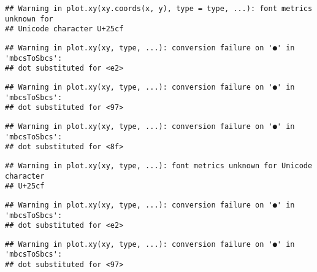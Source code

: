 \documentclass[
]{article}
\newenvironment{Shaded}{\begin{snugshade}}{\end{snugshade}}
\newcommand{\AttributeTok}[1]{\textcolor[rgb]{0.77,0.63,0.00}{#1}}
\newcommand{\DecValTok}[1]{\textcolor[rgb]{0.00,0.00,0.81}{#1}}
\newcommand{\FloatTok}[1]{\textcolor[rgb]{0.00,0.00,0.81}{#1}}
\newcommand{\FunctionTok}[1]{\textcolor[rgb]{0.00,0.00,0.00}{#1}}
\newcommand{\NormalTok}[1]{#1}
\newcommand{\SpecialCharTok}[1]{\textcolor[rgb]{0.00,0.00,0.00}{#1}}
\newcommand{\StringTok}[1]{\textcolor[rgb]{0.31,0.60,0.02}{#1}}
\begin{document}
\begin{verbatim}
## Warning in plot.xy(xy.coords(x, y), type = type, ...): font metrics unknown for
## Unicode character U+25cf
\end{verbatim}

\begin{Shaded}
\end{Shaded}

\begin{verbatim}
## Warning in plot.xy(xy, type, ...): conversion failure on '●' in 'mbcsToSbcs':
## dot substituted for <e2>
\end{verbatim}

\begin{verbatim}
## Warning in plot.xy(xy, type, ...): conversion failure on '●' in 'mbcsToSbcs':
## dot substituted for <97>
\end{verbatim}

\begin{verbatim}
## Warning in plot.xy(xy, type, ...): conversion failure on '●' in 'mbcsToSbcs':
## dot substituted for <8f>
\end{verbatim}

\begin{verbatim}
## Warning in plot.xy(xy, type, ...): font metrics unknown for Unicode character
## U+25cf
\end{verbatim}

\begin{verbatim}
## Warning in plot.xy(xy, type, ...): conversion failure on '●' in 'mbcsToSbcs':
## dot substituted for <e2>
\end{verbatim}

\begin{verbatim}
## Warning in plot.xy(xy, type, ...): conversion failure on '●' in 'mbcsToSbcs':
## dot substituted for <97>
\end{verbatim}
\end{document}
